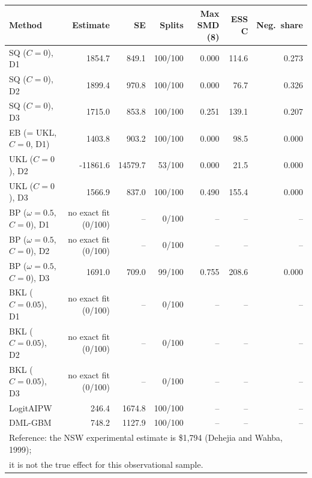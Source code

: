 \begin{tabular}{lrrrrrr}
\hline
Method & Estimate & SE & Splits & Max SMD (8) & ESS C & Neg.\ share \\
\hline
SQ ($C=0$), D1 & 1854.7 & 849.1 & 100/100 & 0.000 & 114.6 & 0.273 \\
SQ ($C=0$), D2 & 1899.4 & 970.8 & 100/100 & 0.000 & 76.7 & 0.326 \\
SQ ($C=0$), D3 & 1715.0 & 853.8 & 100/100 & 0.251 & 139.1 & 0.207 \\
EB (= UKL, $C=0$, D1) & 1403.8 & 903.2 & 100/100 & 0.000 & 98.5 & 0.000 \\
UKL ($C=0$), D2 & -11861.6 & 14579.7 & 53/100 & 0.000 & 21.5 & 0.000 \\
UKL ($C=0$), D3 & 1566.9 & 837.0 & 100/100 & 0.490 & 155.4 & 0.000 \\
BP ($\omega=0.5$, $C=0$), D1 & no exact fit (0/100) & -- & 0/100 & -- & -- & -- \\
BP ($\omega=0.5$, $C=0$), D2 & no exact fit (0/100) & -- & 0/100 & -- & -- & -- \\
BP ($\omega=0.5$, $C=0$), D3 & 1691.0 & 709.0 & 99/100 & 0.755 & 208.6 & 0.000 \\
BKL ($C=0.05$), D1 & no exact fit (0/100) & -- & 0/100 & -- & -- & -- \\
BKL ($C=0.05$), D2 & no exact fit (0/100) & -- & 0/100 & -- & -- & -- \\
BKL ($C=0.05$), D3 & no exact fit (0/100) & -- & 0/100 & -- & -- & -- \\
LogitAIPW & 246.4 & 1674.8 & 100/100 & -- & -- & -- \\
DML-GBM & 748.2 & 1127.9 & 100/100 & -- & -- & -- \\
\hline
\multicolumn{7}{l}{Reference: the NSW experimental estimate is \$1,794 (Dehejia and Wahba, 1999);} \\
\multicolumn{7}{l}{it is not the true effect for this observational sample.} \\
\hline
\end{tabular}
